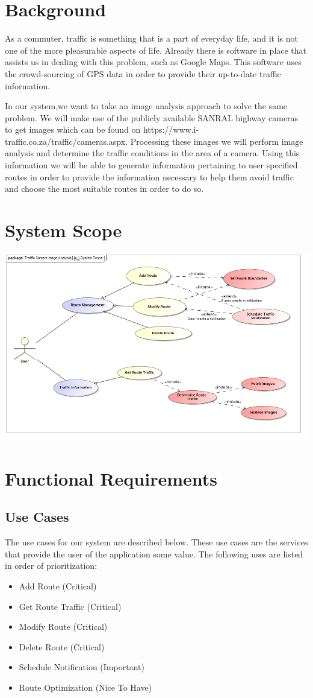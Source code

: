\documentclass[a4paper,12pt]{article}
\begin{document}
\section{Background}
As a commuter, traffic is something that is a part of everyday life, and it is not one of the more pleasurable aspects of life. Already there is software in place that assists us in dealing with this problem, such as Google Maps. This software uses the crowd-sourcing of GPS data in order to provide their up-to-date traffic information.

In our system,we want to take an image analysis approach to solve the same problem. We will make use of the publicly available SANRAL highway cameras to get images which can be found on https://www.i-traffic.co.za/traffic/cameras.aspx. Processing these images we will perform image analysis and determine the traffic conditions in the area of a camera. Using this information we will be able to generate information pertaining to user specified routes in order to provide the information necessary to help them avoid traffic and choose the most suitable routes in order to do so.
\section{System Scope}
\includegraphics[width=\textwidth]{images/System_Scope.jpg}
\section{Functional Requirements}
\subsection{Use Cases}
The use cases for our system are described below. These use cases are the services that provide the user of the application some value. The following uses are listed in order of prioritization:
\begin{itemize}
\item Add Route 			(Critical)
\item Get Route Traffic		(Critical)
\item Modify Route			(Critical)
\item Delete Route			(Critical)
\item Schedule Notification (Important)
\item Route Optimization 	(Nice To Have)
\end{itemize}
\end{document}
